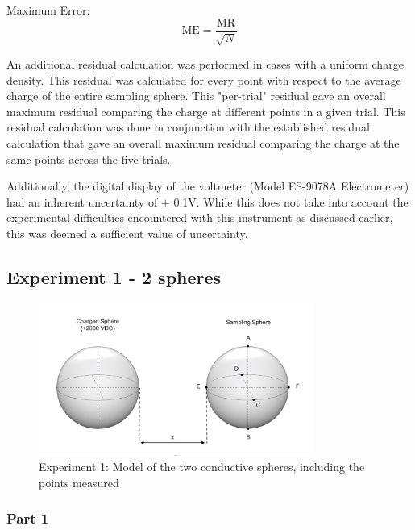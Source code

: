 Maximum Error: 
$$\mathrm{ME}=\frac{\mathrm{MR}}{\sqrt{N}}$$


An additional residual calculation was performed in cases with a uniform charge density. This residual was calculated for every point with respect to the average charge of the entire sampling sphere. This "per-trial" residual gave an overall maximum residual comparing the charge at different points in a given trial. This residual calculation was done in conjunction with the established residual calculation that gave an overall maximum residual comparing the charge at the same points across the five trials.

Additionally, the digital display of the voltmeter (Model ES-9078A Electrometer) had an inherent uncertainty of $\pm$ 0.1V. While this does not take into account the experimental difficulties encountered with this instrument as discussed earlier, this was deemed a sufficient value of uncertainty. 

\newpage

\subsection{Experiment 1 - 2 spheres}

\begin{figure}[h]
    \centering
    \includegraphics[height=5cm]{photos/experiment1image.png} %
    \caption{Experiment 1: Model of the two conductive spheres, including the points measured}
    \label{fig:experiment1}
\end{figure}

\subsubsection{Part 1}

